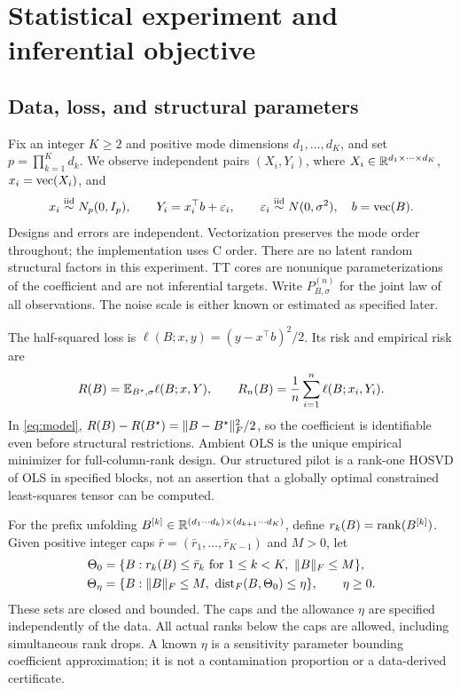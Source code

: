 \section{Statistical experiment and inferential objective}\label{sec:problem}
\subsection{Data, loss, and structural parameters}
Fix an integer $K\ge2$ and positive mode dimensions $d_1,\ldots,d_K$, and set $p=\prod_{k=1}^Kd_k$. We observe independent pairs $(X_i,Y_i)$, where $X_i\in\mathbb R^{d_1\times\cdots\times d_K}$, $x_i=\operatorname{vec}(X_i)$, and
\begin{equation}\label{eq:model}
 x_i\stackrel{\rm iid}{\sim}N_p(0,I_p),\qquad
 Y_i=x_i^\top b+\varepsilon_i,\qquad
 \varepsilon_i\stackrel{\rm iid}{\sim}N(0,\sigma^2),\quad b=\operatorname{vec}(B).
\end{equation}
Designs and errors are independent. Vectorization preserves the mode order throughout; the implementation uses C order. There are no latent random structural factors in this experiment. TT cores are nonunique parameterizations of the coefficient and are not inferential targets. Write $P_{B,\sigma}^{(n)}$ for the joint law of all observations. The noise scale is either known or estimated as specified later.

The half-squared loss is $\ell(B;x,y)=(y-x^\top b)^2/2$. Its risk and empirical risk are
\[
 R(B)=\mathbb E_{B^\star,\sigma}\ell(B;x,Y),\qquad
 R_n(B)=\frac1n\sum_{i=1}^n\ell(B;x_i,Y_i).
\]
In \eqref{eq:model}, $R(B)-R(B^\star)=\lVert B-B^\star\rVert_F^2/2$, so the coefficient is identifiable even before structural restrictions. Ambient OLS is the unique empirical minimizer for full-column-rank design. Our structured pilot is a rank-one HOSVD of OLS in specified blocks, not an assertion that a globally optimal constrained least-squares tensor can be computed.

For the prefix unfolding $B^{[k]}\in\mathbb R^{(d_1\cdots d_k)\times(d_{k+1}\cdots d_K)}$, define $r_k(B)=\operatorname{rank}(B^{[k]})$. Given positive integer caps $\bar r=(\bar r_1,\ldots,\bar r_{K-1})$ and $M>0$, let
\begin{align*}
 \Th_0&=\{B:r_k(B)\le\bar r_k\text{ for }1\le k<K,\ \norm{B}_F\le M\},\\
 \Th_\eta&=\{B:\norm{B}_F\le M,\ \dist_F(B,\Th_0)\le\eta\},\qquad\eta\ge0.
\end{align*}
These sets are closed and bounded. The caps and the allowance $\eta$ are specified independently of the data. All actual ranks below the caps are allowed, including simultaneous rank drops. A known $\eta$ is a sensitivity parameter bounding coefficient approximation; it is not a contamination proportion or a data-derived certificate.


